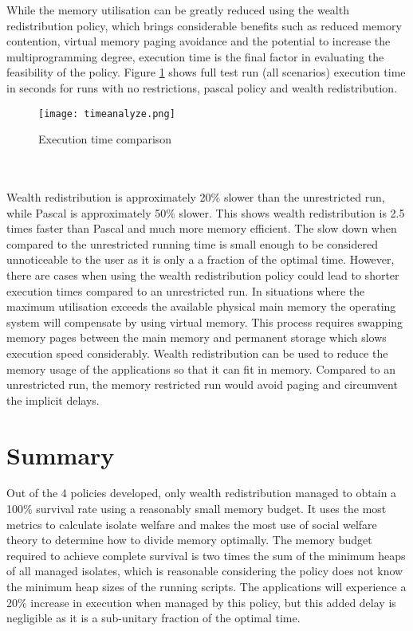 \documentclass{l4proj}
\begin{document}
While the memory utilisation can be greatly reduced using the wealth redistribution policy, which brings considerable benefits such as reduced memory contention, virtual memory paging avoidance and the potential to increase the multiprogramming degree, execution time is the final factor in evaluating the feasibility of the policy. Figure \ref{time_cmp} shows full test run (all scenarios) execution time in seconds for runs with no restrictions, pascal policy and wealth redistribution.
\begin{figure}[!ht]
  \centering
    \texttt{[image: timeanalyze.png]}
    \caption{Execution time comparison}
    \label{time_cmp}
\end{figure}\\\\
\hspace*{3em} Wealth redistribution is approximately 20\% slower than the unrestricted run, while Pascal is approximately 50\% slower. This shows wealth redistribution is 2.5 times faster than Pascal and much more memory efficient. The slow down when compared to the unrestricted running time is small enough to be considered unnoticeable to the user as it is only a a fraction of the optimal time. However, there are cases when using the wealth redistribution policy could lead to shorter execution times compared to an unrestricted run. In situations where the maximum utilisation exceeds the available physical main memory the operating system will compensate by using virtual memory. This process requires swapping memory pages between the main memory and permanent storage which slows execution speed considerably. Wealth redistribution can be used to reduce the memory usage of the applications so that it can fit in memory. Compared to an unrestricted run, the memory restricted run would avoid paging and circumvent the implicit delays.
\section{Summary}
\hspace*{3em} Out of the 4 policies developed, only wealth redistribution managed to obtain a 100\% survival rate using a reasonably small memory budget. It uses the most metrics to calculate isolate welfare and makes the most use of social welfare theory to determine how to divide memory optimally. The memory budget required to achieve complete survival is two times the sum of the minimum heaps of all managed isolates, which is reasonable considering the policy does not know the minimum heap sizes of the running scripts. The applications will experience a 20\% increase in execution when managed by this policy, but this added delay is negligible as it is a sub-unitary fraction of the optimal time.
\end{document}
